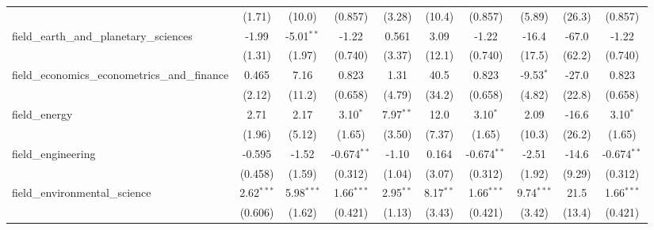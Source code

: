 \begin{tabular}{lccccccccc}
                                                               & (1.71)        & (10.0)        & (0.857)       & (3.28)        & (10.4)         & (0.857)       & (5.89)        & (26.3)        & (0.857)\\   
   field\_earth\_and\_planetary\_sciences                      & -1.99         & -5.01$^{**}$  & -1.22         & 0.561         & 3.09           & -1.22         & -16.4         & -67.0         & -1.22\\   
                                                               & (1.31)        & (1.97)        & (0.740)       & (3.37)        & (12.1)         & (0.740)       & (17.5)        & (62.2)        & (0.740)\\   
   field\_economics\_econometrics\_and\_finance                & 0.465         & 7.16          & 0.823         & 1.31          & 40.5           & 0.823         & -9.53$^{*}$   & -27.0         & 0.823\\   
                                                               & (2.12)        & (11.2)        & (0.658)       & (4.79)        & (34.2)         & (0.658)       & (4.82)        & (22.8)        & (0.658)\\   
   field\_energy                                               & 2.71          & 2.17          & 3.10$^{*}$    & 7.97$^{**}$   & 12.0           & 3.10$^{*}$    & 2.09          & -16.6         & 3.10$^{*}$\\   
                                                               & (1.96)        & (5.12)        & (1.65)        & (3.50)        & (7.37)         & (1.65)        & (10.3)        & (26.2)        & (1.65)\\   
   field\_engineering                                          & -0.595        & -1.52         & -0.674$^{**}$ & -1.10         & 0.164          & -0.674$^{**}$ & -2.51         & -14.6         & -0.674$^{**}$\\   
                                                               & (0.458)       & (1.59)        & (0.312)       & (1.04)        & (3.07)         & (0.312)       & (1.92)        & (9.29)        & (0.312)\\   
   field\_environmental\_science                               & 2.62$^{***}$  & 5.98$^{***}$  & 1.66$^{***}$  & 2.95$^{**}$   & 8.17$^{**}$    & 1.66$^{***}$  & 9.74$^{***}$  & 21.5          & 1.66$^{***}$\\   
                                                               & (0.606)       & (1.62)        & (0.421)       & (1.13)        & (3.43)         & (0.421)       & (3.42)        & (13.4)        & (0.421)\\   

\end{tabular}
